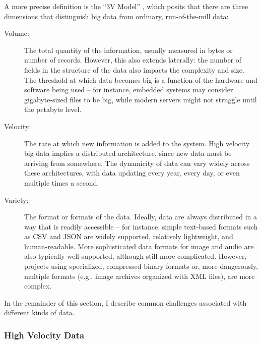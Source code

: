 A more precise definition is the ``3V Model'' \cite{douglas2012importance}, which posits that there are three dimensions that distinguish big data from ordinary, run-of-the-mill data:

\begin{description}
	\item[Volume:] The total quantity of the information, usually measured in bytes or number of records. However, this also extends laterally: the number of fields in the structure of the data also impacts the complexity and size. The threshold at which data becomes big is a function of the hardware and software being used -- for instance, embedded systems may consider gigabyte-sized files to be big, while modern servers might not struggle until the petabyte level.
	\item[Velocity:] The rate at which new information is added to the system. High velocity big data implies a distributed architecture, since new data must be arriving from somewhere. The dynamicity of data can vary widely across these architectures, with data updating every year, every day, or even multiple times a second.
	\item[Variety:] The format or formats of the data. Ideally, data are always distributed in a way that is readily accessible -- for instance, simple text-based formats such as CSV and JSON are widely supported, relatively lightweight, and human-readable. More sophisticated data formats for image and audio are also typically well-supported, although still more complicated. However, projects using specialized, compressed binary formats or, more dangerously, multiple formats (e.g., image archives organized with XML files), are more complex.
\end{description}

In the remainder of this section, I describe common challenges associated with different kinds of data.

\subsubsection{High Velocity Data}


